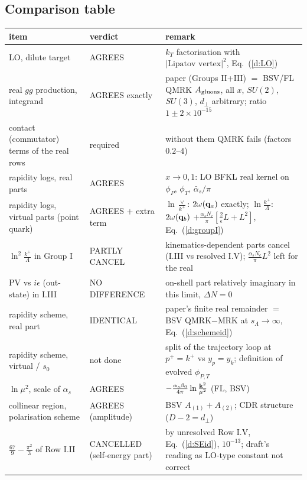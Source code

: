 \subsection{Comparison table}
\begin{center}
\renewcommand{\arraystretch}{1.22}
\begin{tabular}{|p{}|p{}|p{}|}\hline
item & verdict & remark\\\hline
LO, dilute target & AGREES & $k_T$ factorisation with $|\text{Lipatov vertex}|^2$, Eq.~(\ref{d:LO})\\
real $gg$ production, integrand & AGREES exactly & paper (Groups II+III) $=$ BSV/FL QMRK $A_{\rm gluons}$, all $x$, $SU(2)$, $SU(3)$, $d_\perp$ arbitrary; ratio $1\pm2\times10^{-15}$\\
contact (commutator) terms of the real rows & required & without them QMRK fails (factors $0.2$--$4$)\\
rapidity logs, real parts & AGREES & $x\to0,1$: LO BFKL real kernel on $\phi_P$, $\phi_T$, $\bar\alpha_s/\pi$\\
rapidity logs, virtual parts (point quark) & AGREES $+$ extra term & $\ln\frac\vee{k^+}$: $2\omega(\mathbf{q}_a)$ exactly; $\ln\frac{k^+}\Lambda$: $2\omega(\mathbf{q}_b)$ $+\frac{\alpha_sN_c}{\pi}[\frac2\epsilon L+L^2]$, Eq.~(\ref{d:groupI})\\
$\ln^2\frac{k^+}{\Lambda}$ in Group I & PARTLY CANCEL & kinematics-dependent parts cancel (I.III vs resolved I.V); $\frac{\alpha_sN_c}{\pi}L^2$ left for the real\\
PV vs $i\epsilon$ (out-state) in I.III & NO DIFFERENCE & on-shell part relatively imaginary in this limit, $\Delta N=0$\\
rapidity scheme, real part & IDENTICAL & paper's finite real remainder $=$ BSV QMRK$-$MRK at $s_\Lambda\to\infty$, Eq.~(\ref{d:schemeid})\\
rapidity scheme, virtual / $s_0$ & not done & split of the trajectory loop at $p^+=k^+$ vs $y_p=y_k$; definition of evolved $\phi_{P,T}$\\
$\ln\mu^2$, scale of $\alpha_s$ & AGREES & $-\frac{\alpha_s\beta_0}{4\pi}\ln\frac{\mathbf{k}^2}{\mu^2}$ (FL, BSV)\\
collinear region, polarisation scheme & AGREES (amplitude) & BSV $A_{(1)}+A_{(2)}$; CDR structure ($D-2=d_\perp$)\\
$\frac{67}{9}-\frac{\pi^2}{3}$ of Row I.II & CANCELLED (self-energy part) & by unresolved Row I.V, Eq.~(\ref{d:SEid}), $10^{-13}$; draft's reading as LO-type constant not correct\\

\end{tabular}
\end{center}
